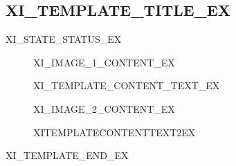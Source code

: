 \subsection{XI_TEMPLATE_TITLE_EX}

XI_STATE_STATUS_EX
\begin{figure}[h]
\centering
XI_IMAGE_1_CONTENT_EX
\caption{\label{fig:img1}XI_TEMPLATE_CONTENT_TEXT_EX}
\end{figure}

\vspace{4\baselineskip}

\begin{figure}[h]
\centering
XI_IMAGE_2_CONTENT_EX
\caption{\label{fig:img2}XITEMPLATECONTENTTEXT2EX}
\end{figure}

\newpage
XI_TEMPLATE_END_EX


